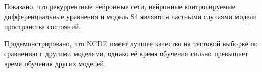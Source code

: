 \documentclass[a4paper, 12pt]{article}
\begin{document}
	Показано, что рекуррентные нейронные сети, нейронные контролируемые дифференциальные уравнения и модель S4 являются частными случаями модели пространства состояний.
	
	Продемонстрировано, что NCDE имеет лучшее качество на тестовой выборке по сравнению с другими моделями, однако её время обучения сильно превышает время обучения других моделей
	
	\newpage
	
	
	
\end{document}
